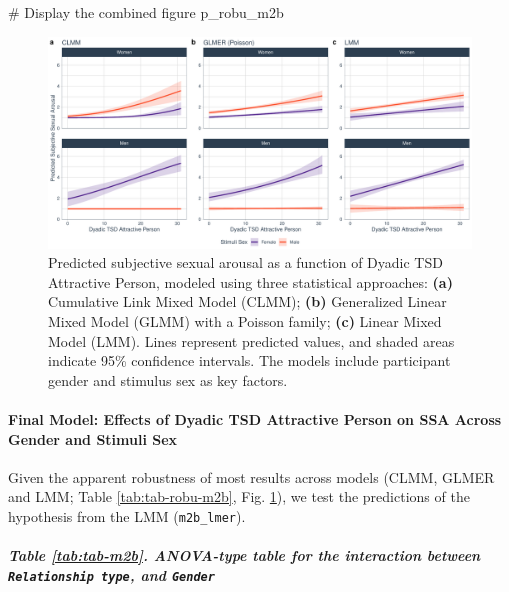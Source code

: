 \documentclass[
  bookmarksnumbered]{article}
\newenvironment{Shaded}{\begin{snugshade}}{\end{snugshade}}
\newcommand{\CommentTok}[1]{\textcolor[rgb]{0.50,0.62,0.50}{#1}}
\newcommand{\NormalTok}[1]{\textcolor[rgb]{0.80,0.80,0.80}{#1}}
\begin{document}
\begin{Shaded}
\begin{Highlighting}[]
\CommentTok{\# Display the combined figure}
\NormalTok{p\_robu\_m2b}
\end{Highlighting}
\end{Shaded}

\begin{figure}
\centering
\includegraphics{Sexual_Desire_Arousal_files/figure-latex/preds-m2b-1.pdf}
\caption{\label{fig:preds-m2b}Predicted subjective sexual arousal as a function of Dyadic TSD Attractive Person, modeled using three statistical approaches: \textbf{(a)} Cumulative Link Mixed Model (CLMM); \textbf{(b)} Generalized Linear Mixed Model (GLMM) with a Poisson family; \textbf{(c)} Linear Mixed Model (LMM). Lines represent predicted values, and shaded areas indicate 95\% confidence intervals. The models include participant gender and stimulus sex as key factors.}
\end{figure}

\paragraph{Final Model: Effects of Dyadic TSD Attractive Person on SSA Across Gender and Stimuli Sex}\label{final-model-effects-of-dyadic-tsd-attractive-person-on-ssa-across-gender-and-stimuli-sex}

Given the apparent robustness of most results across models (CLMM, GLMER and LMM; Table \ref{tab:tab-robu-m2b}, Fig. \ref{fig:preds-m2b}), we test the predictions of the hypothesis from the LMM (\texttt{m2b\_lmer}).

\subparagraph{\texorpdfstring{Table \ref{tab:tab-m2b}. ANOVA-type table for the interaction between \texttt{Relationship\ type}, and \texttt{Gender}}{Table \ref{tab:tab-m2b}. ANOVA-type table for the interaction between Relationship type, and Gender}}\label{table-reftabtab-m2b.-anova-type-table-for-the-interaction-between-relationship-type-and-gender}
\end{document}
